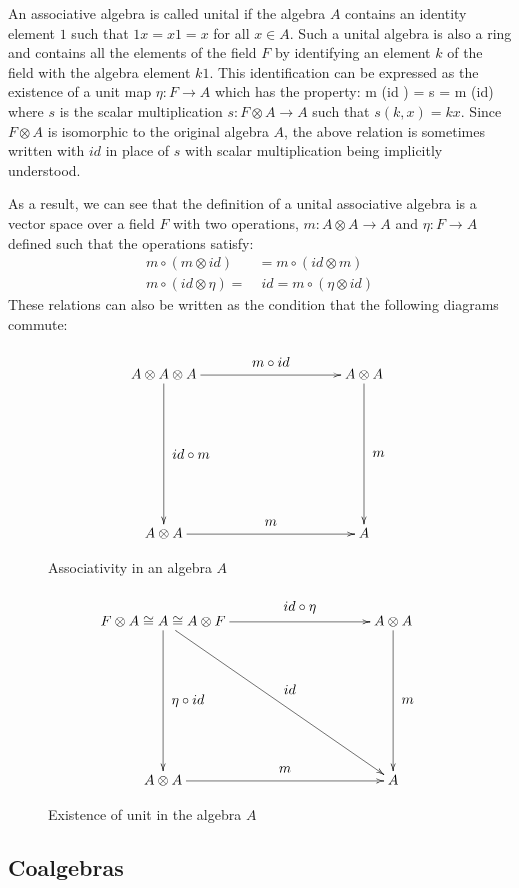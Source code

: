 An associative algebra is called unital if the algebra $A$ contains an identity element $1$ such
that $1x = x1 = x$ for all $x \in A$. Such a unital algebra is also a ring and contains all the
elements of the field $F$ by identifying an element $k$ of the field with the algebra element $k1$.
This identification can be expressed as the existence of a unit map $\eta: F \rightarrow A$ which
has the property:
\beq
m \circ (id \otimes \eta) = s = m \circ (\eta \otimes id)
\eeq
where $s$ is the scalar multiplication $s: F \otimes A \rightarrow A$ such that $s(k, x) = kx$.
Since $F \otimes A$ is isomorphic to the original algebra $A$, the above relation is sometimes
written with $id$ in place of $s$ with scalar multiplication being implicitly understood.


As a result, we can see that the definition of a unital associative algebra is a
vector space over a field $F$ with two operations, $m: A \otimes A \rightarrow A$
and $\eta: F \rightarrow A$ defined such that the operations satisfy:
\begin{align}
m\circ(m \otimes id) &= m\circ(id \otimes m) \\
m \circ (id \otimes \eta) = &\; id = m \circ (\eta \otimes id)
\end{align}
These relations can also be written as the condition that the following diagrams
commute:
\pagebreak
\begin{figure}[!h]
  \[
  \xymatrix@=100pt{
    A \otimes A \otimes A \ar[r]^-*+{m \circ id} \ar[d]^-*+{id \circ m}& A \otimes A \ar[d]^-*+{m}\\
    A \otimes A \ar[r]^-*+{m} & A \\
  }
  \]
  \caption{Associativity in an algebra $A$}
  \label{assoc-algebra}
\end{figure}
\begin{figure}[!h]
  \[
  \xymatrix@=100pt{
    F \otimes A \cong A \cong A \otimes F
       \ar[r]^-*+{id \circ \eta}
       \ar[d]^-*+{\eta \circ id}
       \ar[dr]^-*+{id} & A \otimes A \ar[d]^-*+{m}\\
    A \otimes A \ar[r]^-*+{m} & A \\
  }
  \]
  \caption{Existence of unit in the algebra $A$}
  \label{unit-algebra}
\end{figure}




\subsection{Coalgebras}


